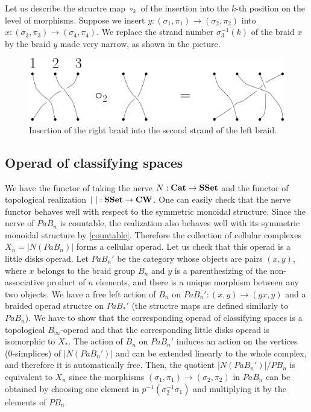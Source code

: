\documentclass[TFM.tex]{subfiles}
\begin{document}
Let us describe the structre map $\circ_k$ of the insertion into the $k$-th position on the level of morphisms. Suppose we insert $y:(\sigma_1,\pi_1)\to (\sigma_2,\pi_2)$ into $x:(\sigma_3,\pi_3)\to(\sigma_4,\pi_4)$. We replace the strand number $\sigma^{-1}_3(k)$ of the braid $x$ by the braid $y$ made very narrow, as shown in the picture.

\begin{figure}[h!]
\includegraphics[scale=0.7]{Imagenes/insercion.png}
\caption{Insertion of the right braid into the second strand of the left braid.}
\end{figure}

\subsection{Operad of classifying spaces}

We have the functor of taking the nerve $N:\mathrm{\mathbf{Cat}}\to\mathrm{\mathbf{SSet}}$ and the functor of topological realization $|\ |:\mathrm{\mathbf{SSet}}\to \mathrm{\mathbf{CW}}$. One can easily check that the nerve functor behaves well with respect to the symmetric monoidal structure. Since the nerve of $PaB_n$ is countable, the realization also behaves well with its symmetric monoidal structure by \ref{countable}. Therefore the collection of cellular complexes $X_n=|N(PaB_n)|$ forms a cellular operad. Let us check that this operad is a little disks operad. Let $PaB_n'$ be the category whose objects are pairs $(x,y)$, where $x$ belongs to the braid group $B_n$ and $y$ is a parenthesizing of the non-associative product of $n$ elements, and there is a unique morphism between any two objects. We have a free left action of $B_n$ on $PaB_n':(x,y)\to (gx,y)$ and a braided operad structre on $PaB_*'$ (the structre maps are defined similarly to $PaB_n$). We have to show that the corresponding operad of classifying spaces is a topological $B_\infty$-operad and that the corresponding little disks operad is isomorphic to $X_*$. The action of $B_n$ on $PaB_n'$ induces an action on the vertices (0-simplices) of $|N(PaB_n')|$ and can be extended linearly to the whole complex, and therefore it is automatically free. Then, the quotient $|N(PaB_n')|/PB_n$ is equivalent to $X_n$ since the morphisms $(\sigma_1,\pi_1)\to(\sigma_2,\pi_2)$ in $PaB_n$ can be obtained by choosing one element in $p^{-1}(\sigma_2^{-1}\sigma_1)$ and multiplying it by the elements of $PB_n$. %
\end{document}

